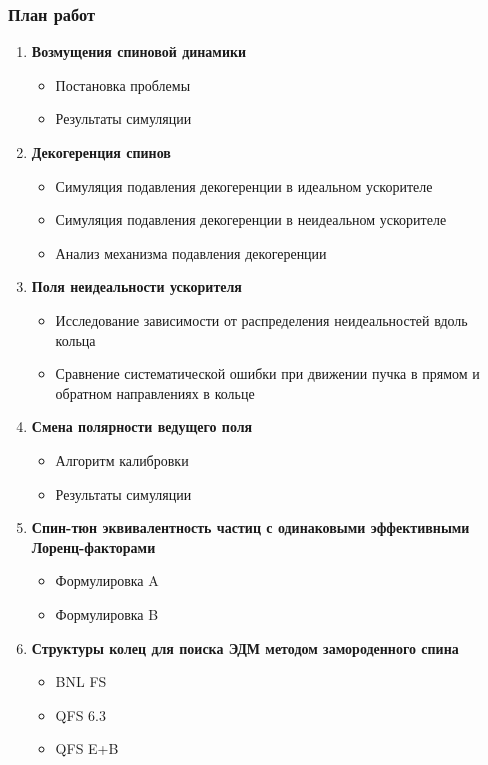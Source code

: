 \documentclass[14pt]{beamer}
\begin{document}
\begin{frame}
\frametitle{План работ}
\begin{enumerate}
  \item \textbf{Возмущения спиновой динамики}
  \begin{itemize}
  	\item Постановка проблемы
  	\item Результаты симуляции
  \end{itemize}
  \item \textbf{Декогеренция спинов}
  \begin{itemize}
    \item Симуляция подавления декогеренции в идеальном ускорителе
    \item Симуляция подавления декогеренции в неидеальном ускорителе
    \item Анализ механизма подавления декогеренции
  \end{itemize}
\end{enumerate}
\end{frame}
\begin{frame}
	\begin{enumerate}	\setcounter{enumi}{2}
		\item \textbf{Поля неидеальности ускорителя}
		\begin{itemize}
			\item Исследование зависимости от распределения неидеальностей вдоль кольца
			\item Сравнение систематической ошибки при движении пучка в прямом и обратном направлениях в кольце
		\end{itemize}
		\item \textbf{Смена полярности ведущего поля}
		\begin{itemize}
			\item Алгоритм калибровки
			\item Результаты симуляции
		\end{itemize}
	\end{enumerate}
\end{frame}
\begin{frame}
	\begin{enumerate}  \setcounter{enumi}{4}
		\item \textbf{Спин-тюн эквивалентность частиц с одинаковыми эффективными Лоренц-факторами}
		\begin{itemize}
			\item Формулировка A
			\item Формулировка B
		\end{itemize}
		\item \textbf{Структуры колец для поиска ЭДМ методом замороденного спина}
		\begin{itemize}
			\item BNL FS
			\item QFS 6.3
			\item QFS E+B
		\end{itemize}
	\end{enumerate}
\end{frame}
\end{document}
